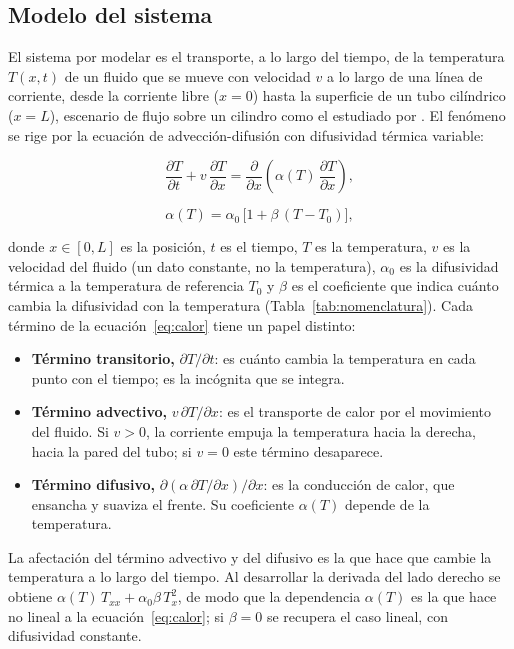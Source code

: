 \documentclass[final,5p,times,twocolumn,authoryear,11pt]{elsarticle}
\begin{document}
\subsection{Modelo del sistema}

El sistema por modelar es el transporte, a lo largo del tiempo, de la temperatura $T(x,t)$ de un fluido que se mueve con velocidad $v$ a lo largo de una línea de corriente, desde la corriente libre ($x=0$) hasta la superficie de un tubo cilíndrico ($x=L$), escenario de flujo sobre un cilindro como el estudiado por \citet{Singh2024}. El fenómeno se rige por la ecuación de advección-difusión con difusividad térmica variable:

\begin{equation}
\frac{\partial T}{\partial t} + v\,\frac{\partial T}{\partial x} = \frac{\partial}{\partial x}\!\left(\alpha(T)\,\frac{\partial T}{\partial x}\right),
\label{eq:calor}
\end{equation}

\begin{equation}
\alpha(T)=\alpha_0\,\bigl[1+\beta\,(T-T_0)\bigr],
\label{eq:alpha}
\end{equation}

\noindent donde $x \in [0,L]$ es la posición, $t$ es el tiempo, $T$ es la temperatura, $v$ es la velocidad del fluido (un dato constante, no la temperatura), $\alpha_0$ es la difusividad térmica a la temperatura de referencia $T_0$ y $\beta$ es el coeficiente que indica cuánto cambia la difusividad con la temperatura (Tabla~\ref{tab:nomenclatura}). Cada término de la ecuación~\eqref{eq:calor} tiene un papel distinto:
\begin{itemize}
    \item \textbf{Término transitorio,} $\partial T/\partial t$: es cuánto cambia la temperatura en cada punto con el tiempo; es la incógnita que se integra.
    \item \textbf{Término advectivo,} $v\,\partial T/\partial x$: es el transporte de calor por el movimiento del fluido. Si $v>0$, la corriente empuja la temperatura hacia la derecha, hacia la pared del tubo; si $v=0$ este término desaparece.
    \item \textbf{Término difusivo,} $\partial(\alpha\,\partial T/\partial x)/\partial x$: es la conducción de calor, que ensancha y suaviza el frente. Su coeficiente $\alpha(T)$ depende de la temperatura.
\end{itemize}
La afectación del término advectivo y del difusivo es la que hace que cambie la temperatura a lo largo del tiempo. Al desarrollar la derivada del lado derecho se obtiene $\alpha(T)\,T_{xx} + \alpha_0\beta\,T_x^{2}$, de modo que la dependencia $\alpha(T)$ es la que hace no lineal a la ecuación~\eqref{eq:calor}; si $\beta=0$ se recupera el caso lineal, con difusividad constante.
\end{document}
